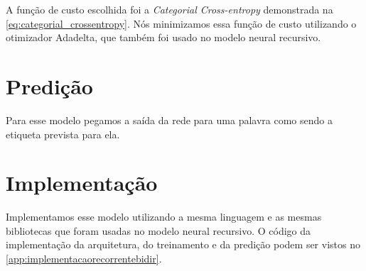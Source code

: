 A função de custo escolhida foi a \textit{Categorial Cross-entropy} demonstrada na \autoref{eq:categorial_crossentropy}. Nós minimizamos essa função de custo utilizando o otimizador Adadelta, que também foi usado no modelo neural recursivo.


\section{Predição}

Para esse modelo pegamos a saída da rede para uma palavra como sendo a etiqueta prevista para ela.



\section{Implementação}

Implementamos esse modelo utilizando a mesma linguagem e as mesmas bibliotecas que foram usadas no modelo neural recursivo. O código da implementação da arquitetura, do treinamento e da predição podem ser vistos no \autoref{app:implementacaorecorrentebidir}.